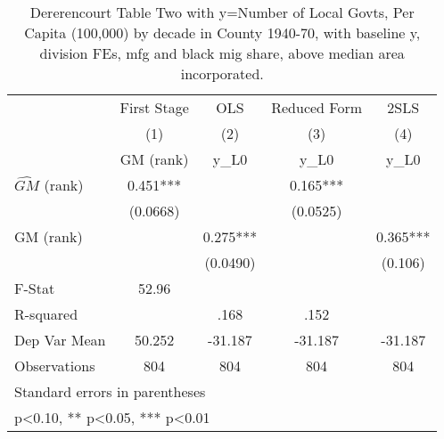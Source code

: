 \begin{table}[htbp]\centering
\def\sym#1{\ifmmode^{#1}\else\(^{#1}\)\fi}
\caption{Dererencourt Table Two with y=Number of Local Govts, Per Capita (100,000) by decade in County 1940-70, with baseline y, division FEs, mfg and black mig share, above median area incorporated.}
\begin{tabular}{l*{4}{c}}
\toprule
                    & First Stage   &         OLS   &Reduced Form   &        2SLS   \\
                    &\multicolumn{1}{c}{(1)}&\multicolumn{1}{c}{(2)}&\multicolumn{1}{c}{(3)}&\multicolumn{1}{c}{(4)}\\
                    &\multicolumn{1}{c}{GM  (rank)}&\multicolumn{1}{c}{y\_L0}&\multicolumn{1}{c}{y\_L0}&\multicolumn{1}{c}{y\_L0}\\
\midrule
$\hat{GM}$ (rank)   &       0.451***&               &       0.165***&               \\
                    &    (0.0668)   &               &    (0.0525)   &               \\
\addlinespace
GM  (rank)          &               &       0.275***&               &       0.365***\\
                    &               &    (0.0490)   &               &     (0.106)   \\
\midrule
F-Stat              &       52.96   &               &               &               \\
R-squared           &               &        .168   &        .152   &               \\
Dep Var Mean        &      50.252   &     -31.187   &     -31.187   &     -31.187   \\
Observations        &         804   &         804   &         804   &         804   \\
\bottomrule
\multicolumn{5}{l}{\footnotesize Standard errors in parentheses}\\
\multicolumn{5}{l}{\footnotesize * p<0.10, ** p<0.05, *** p<0.01}\\
\end{tabular}
\end{table}
